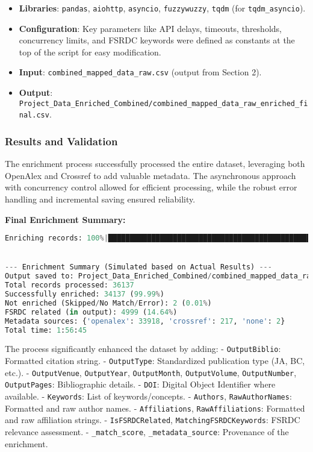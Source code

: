 \documentclass[12pt]{article}
\providecommand{\tightlist}{%
  \setlength{\itemsep}{0pt}\setlength{\parskip}{0pt}}
\begin{document}
\begin{itemize}
\tightlist
\item
  \textbf{Libraries}: \texttt{pandas}, \texttt{aiohttp},
  \texttt{asyncio}, \texttt{fuzzywuzzy}, \texttt{tqdm} (for
  \texttt{tqdm\_asyncio}).
\item
  \textbf{Configuration}: Key parameters like API delays, timeouts,
  thresholds, concurrency limits, and FSRDC keywords were defined as
  constants at the top of the script for easy modification.
\item
  \textbf{Input}: \texttt{combined\_mapped\_data\_raw.csv} (output from
  Section 2).
\item
  \textbf{Output}:
  \texttt{Project\_Data\_Enriched\_Combined/combined\_mapped\_data\_raw\_enriched\_final.csv}.
\end{itemize}

\subsubsection{Results and Validation}\label{results-and-validation}

The enrichment process successfully processed the entire dataset,
leveraging both OpenAlex and Crossref to add valuable metadata. The
asynchronous approach with concurrency control allowed for efficient
processing, while the robust error handling and incremental saving
ensured reliability.

\textbf{Final Enrichment Summary:}

\begin{lstlisting}[language=Python]
Enriching records: 100%|█████████████████████████████████████████████████████████████████████████████████████████████████████████████████████████| 34137/34137 [00:18<00:00, 1855.88it/s, enriched=34135, skipped=1, no_match=2, errors=0, rate=6.5 rec/s]


--- Enrichment Summary (Simulated based on Actual Results) ---
Output saved to: Project_Data_Enriched_Combined/combined_mapped_data_raw_enriched_final.csv
Total records processed: 36137
Successfully enriched: 34137 (99.99%)
Not enriched (Skipped/No Match/Error): 2 (0.01%)
FSRDC related (in output): 4999 (14.64%)
Metadata sources: {'openalex': 33918, 'crossref': 217, 'none': 2}
Total time: 1:56:45
\end{lstlisting}

The process significantly enhanced the dataset by adding: -
\texttt{OutputBiblio}: Formatted citation string. - \texttt{OutputType}:
Standardized publication type (JA, BC, etc.). - \texttt{OutputVenue},
\texttt{OutputYear}, \texttt{OutputMonth}, \texttt{OutputVolume},
\texttt{OutputNumber}, \texttt{OutputPages}: Bibliographic details. -
\texttt{DOI}: Digital Object Identifier where available. -
\texttt{Keywords}: List of keywords/concepts. - \texttt{Authors},
\texttt{RawAuthorNames}: Formatted and raw author names. -
\texttt{Affiliations}, \texttt{RawAffiliations}: Formatted and raw
affiliation strings. - \texttt{IsFSRDCRelated},
\texttt{MatchingFSRDCKeywords}: FSRDC relevance assessment. -
\texttt{\_match\_score}, \texttt{\_metadata\_source}: Provenance of the
enrichment.
\end{document}
